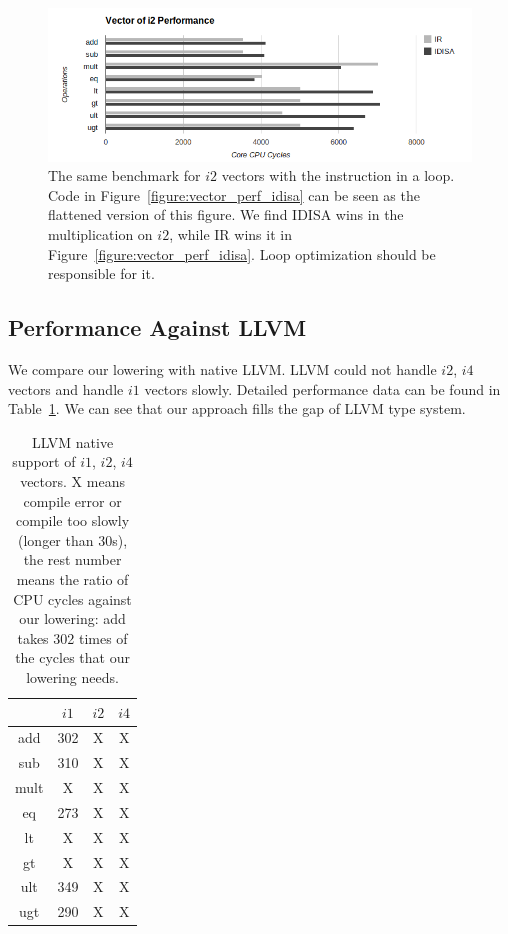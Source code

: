 \begin{figure}[ht!]
\centering
\includegraphics[width=140mm]{draw/loop_vector_i2.png}
\caption[Vector Of $i2$ Tested In A Loop]{The same benchmark for $i2$ vectors with the instruction in a loop. Code in Figure~\ref{figure:vector_perf_idisa} can be seen as the flattened version of this figure. We find IDISA wins in the multiplication on $i2$, while IR wins it in Figure~\ref{figure:vector_perf_idisa}. Loop optimization should be responsible for it.}
\label{figure:loop_vector_i2}
\end{figure}

\subsection{Performance Against LLVM}
We compare our lowering with native LLVM\@. LLVM could not handle $i2$, $i4$ vectors and handle $i1$ vectors slowly. Detailed performance data can be found in Table~\ref{table:vector_perf_LLVM}. We can see that our approach fills the gap of LLVM type system.

\begin{table}[h]
\centering
\begin{tabular}{|c|c|c|c|}
\hline
     & $i1$ & $i2$ & $i4$ \\ \hline
add  & 302  & X    & X    \\ \hline
sub  & 310  & X    & X    \\ \hline
mult & X    & X    & X    \\ \hline
eq   & 273  & X    & X    \\ \hline
lt   & X    & X    & X    \\ \hline
gt   & X    & X    & X    \\ \hline
ult  & 349  & X    & X    \\ \hline
ugt  & 290  & X    & X    \\ \hline
\end{tabular}
\caption[LLVM Native Support for $i1$, $i2$, $i4$ Vectors]{LLVM native support of $i1$, $i2$, $i4$ vectors. X means compile error or compile too slowly (longer than 30s), the rest number means the ratio of CPU cycles against our lowering: add takes 302 times of the cycles that our lowering needs.}
\label{table:vector_perf_LLVM}
\end{table}

